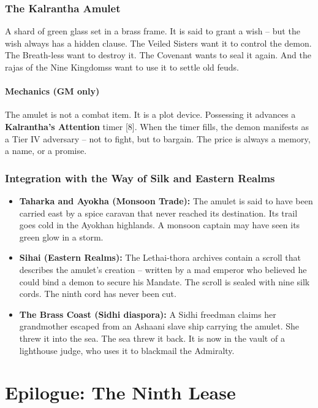\documentclass[12pt,oneside]{book}
\begin{document}
\subsection*{The Kalrantha Amulet}
A shard of green glass set in a brass frame. It is said to grant a wish -- but the wish always has a hidden clause. The Veiled Sisters want it to control the demon. The Breath-less want to destroy it. The Covenant wants to seal it again. And the rajas of the Nine Kingdomss want to use it to settle old feuds.

\subsubsection*{Mechanics (GM only)}
The amulet is not a combat item. It is a plot device. Possessing it advances a \textbf{Kalrantha's Attention} timer [8]. When the timer fills, the demon manifests as a Tier IV adversary -- not to fight, but to bargain. The price is always a memory, a name, or a promise.

\subsection*{Integration with the Way of Silk and Eastern Realms}
\begin{itemize}
  \item \textbf{Taharka and Ayokha (Monsoon Trade):} The amulet is said to have been carried east by a spice caravan that never reached its destination. Its trail goes cold in the Ayokhan highlands. A monsoon captain may have seen its green glow in a storm.
  \item \textbf{Sihai (Eastern Realms):} The Lethai-thora archives contain a scroll that describes the amulet's creation -- written by a mad emperor who believed he could bind a demon to secure his Mandate. The scroll is sealed with nine silk cords. The ninth cord has never been cut.
  \item \textbf{The Brass Coast (Sidhi diaspora):} A Sidhi freedman claims her grandmother escaped from an Ashaani slave ship carrying the amulet. She threw it into the sea. The sea threw it back. It is now in the vault of a lighthouse judge, who uses it to blackmail the Admiralty.
\end{itemize}

\chapter*{Epilogue: The Ninth Lease}
\end{document}
